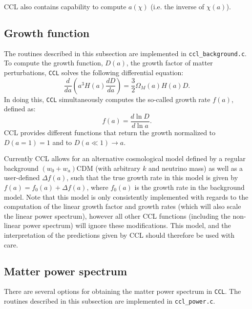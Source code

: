 \documentclass[\docopts]{\docclass}
\begin{document}
CCL also contains capability to compute $a(\chi)$ (i.e. the inverse of $\chi(a)$).


\subsection{Growth function}
\label{sec:growth}

The routines described in this subsection are implemented in {\tt ccl\_background.c}. 
To compute the growth function, $D(a)$, the growth factor of matter perturbations, {\tt CCL} solves the following differential equation:
\begin{equation}
  \frac{d}{da}\left(a^3H(a)\frac{dD}{da}\right)=\frac{3}{2}\Omega_M(a)H(a)D.
\end{equation}
In doing this, {\tt CCL} simultaneously computes the so-called growth rate $f(a)$, defined as:
\begin{equation}
  f(a)=\frac{d\ln D}{d\ln a}.
\end{equation}
CCL provides different functions that return the growth normalized to $D(a=1)=1$ and to $D(a\ll1)\rightarrow a$.

Currently CCL allows for an alternative cosmological model defined by a regular background $(w_0+w_a)$CDM (with arbitrary $k$ and neutrino mass) as well as a user-defined $\Delta f(a)$, such that the true growth rate in this model is given by $f(a)=f_0(a)+\Delta f(a)$, where $f_0(a)$ is the growth rate in the background model. Note that this model is only consistently implemented with regards to the computation of the linear growth factor and growth rates (which will also scale the linear power spectrum), however all other CCL functions (including the non-linear power spectrum) will ignore these modifications. This model, and the interpretation of the predictions given by CCL should therefore be used with care.

\subsection{Matter power spectrum}
\label{sec:power}

There are several options for obtaining the matter power spectrum in {\tt CCL}. 
The routines described in this subsection are implemented in {\tt ccl\_power.c}.
\end{document}

